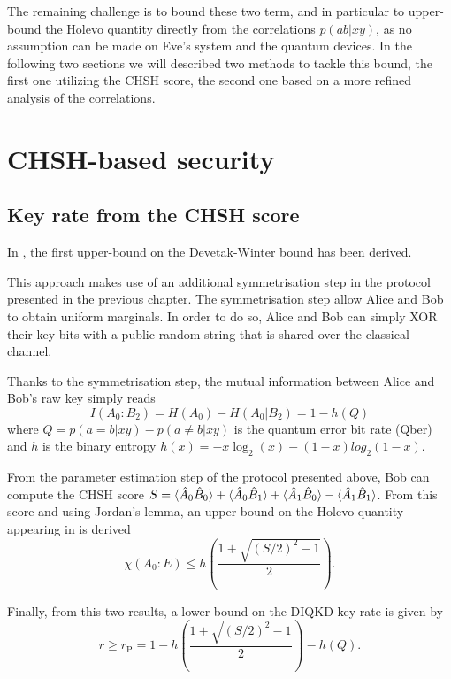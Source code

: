The remaining challenge is to bound these two term, and in particular to upper-bound the Holevo quantity directly from the correlations $p(ab|xy)$, as no assumption can be made on Eve's system and the quantum devices. 
In the following two sections we will described two methods to tackle this bound, the first one utilizing the CHSH score, the second one based on a more refined analysis of the correlations.

\section{CHSH-based security}

\subsection{Key rate from the CHSH score}
\label{sec:pironio}

In \cite{Pironio2009}, the first upper-bound on the Devetak-Winter bound has been derived.

This approach makes use of an additional symmetrisation step in the protocol presented in the previous chapter.
The symmetrisation step allow Alice and Bob to obtain uniform marginals.
In order to do so, Alice and Bob can simply XOR their key bits with a public random string that is shared over the classical channel.

Thanks to the symmetrisation step, the mutual information between Alice and Bob's raw key simply reads
\begin{equation}
	I(A_0 : B_2) = H(A_0) - H(A_0|B_2) = 1 - h(Q)
	\label{eq:}
\end{equation}
where $Q=p(a=b|xy)-p(a\neq b |xy)$ is the quantum error bit rate (Qber) and $h$ is the binary entropy $h(x)=-x \log_2(x) - (1-x)log_2(1-x)$.

From the parameter estimation step of the protocol presented above, Bob can compute the CHSH score $S=\langle {\hat{A}_0 \hat{B}_0} \rangle + \langle {\hat{A}_0 \hat{B}_1} \rangle + \langle {\hat{A}_1 \hat{B}_0} \rangle - \langle {\hat{A}_1 \hat{B}_1} \rangle$.
From this score and using Jordan's lemma, an upper-bound on the Holevo quantity appearing in  is derived
\begin{equation}
	\chi(A_0 : E) \leq h\left(\frac{1+\sqrt{(S/2)^2-1}}{2} \right).
	\label{eq:holevo_pironio}
\end{equation}

Finally, from this two results, a lower bound on the DIQKD key rate is given by
\begin{equation}
	r \geq r_\mathrm{P} = 1 - h\left(\frac{1+\sqrt{(S/2)^2-1}}{2} \right) - h(Q).
	\label{eq:pironio}
\end{equation}

